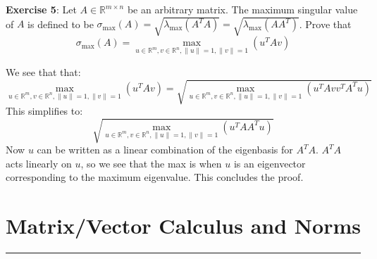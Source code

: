 \documentclass{article}
\begin{document}
\textbf{Exercise 5}: Let $A \in \mathbb{R}^{m \times n}$ be an arbitrary matrix. The maximum singular value of $A$ is defined to be $\sigma_{\max}(A) = \sqrt{\lambda_{\max}(A^{T}A)} = \sqrt{\lambda_{\max}(AA^{T})}$. Prove that
    \begin{equation*}
        \sigma_{\max}(A) = \max_{u \in \mathbb{R}^{m}, v\in \mathbb{R}^{n}, \lVert u \rVert = 1, \lVert v \rVert = 1} (u^{T}Av)
    \end{equation*}
    \begin{answer}
        We see that that:
            \begin{equation*}
                \max_{u \in \mathbb{R}^{m}, v \in \mathbb{R}^{n}, \lVert u \rVert = 1, \lVert v \rVert = 1}(u^{T}Av) = \sqrt{\max_{u \in \mathbb{R}^{m}, v \in \mathbb{R}^{n}, \lVert u \rVert = 1, \lVert v \rVert = 1}(u^{T}Avv^{T}A^{T}u)}
            \end{equation*}
        This simplifies to:
            \begin{equation*}
                \sqrt{\max_{u \in \mathbb{R}^{m}, v \in \mathbb{R}^{n}, \lVert u \rVert = 1, \lVert v \rVert = 1}(u^{T}AA^{T}u)}
            \end{equation*}
        Now $u$ can be written as a linear combination of the eigenbasis for $A^{T}A$. $A^{T}A$ acts linearly on $u$, so we see that the max is when $u$ is an eigenvector corresponding to the maximum eigenvalue. This concludes the proof.
    \end{answer}

\newpage
\section*{Matrix/Vector Calculus and Norms}
\hrule
\end{document}
